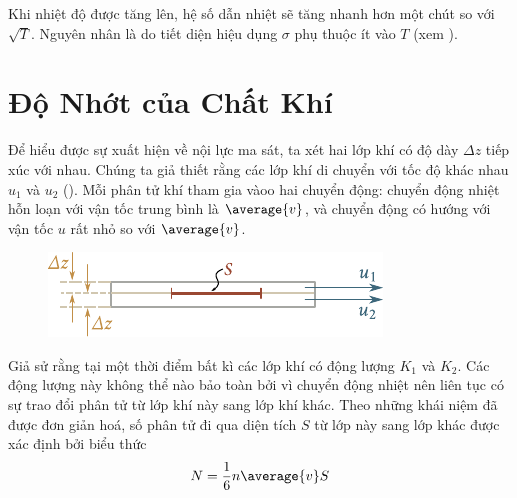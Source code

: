 Khi nhiệt độ được tăng lên, hệ số dẫn nhiệt sẽ tăng nhanh hơn một chút so với $\sqrt{T}$. Nguyên nhân là do tiết diện hiệu dụng $\sigma$ phụ thuộc ít vào $T$ (xem ).

\section{Độ Nhớt của Chất Khí}\label{sec:16_5}

Để hiểu được sự xuất hiện về nội lực ma sát, ta xét hai lớp khí có độ dày $\Delta z$ tiếp xúc với nhau. Chúng ta giả thiết rằng các lớp khí di chuyển với tốc độ khác nhau $u_1$ và $u_2$ (). Mỗi phân tử khí tham gia vàoo hai chuyển động: chuyển động nhiệt hỗn loạn với vận tốc trung bình là $\average{v}$, và chuyển động có hướng với vận tốc $u$ rất nhỏ so với $\average{v}$.

\begin{figure}[!htb]
	\begin{center}
		\includegraphics[scale=1]{figures/ch_16/fig_16_8.pdf}
		\caption[]{}
		\label{fig:16_8}
	\end{center}
\end{figure}

Giả sử rằng tại một thời điểm bất kì các lớp khí có động lượng $K_1$ và $K_2$. Các động lượng này không thể nào bảo toàn bởi vì chuyển động nhiệt nên liên tục có sự trao đổi phân tử từ lớp khí này sang lớp khí khác. Theo những khái niệm đã được đơn giản hoá, số phân tử đi qua diện tích $S$ từ lớp này sang lớp khác được xác định bởi biểu thức
\begin{equation}\label{eq:16_28}
    N = \frac{1}{6} n \average{v} S
\end{equation}

